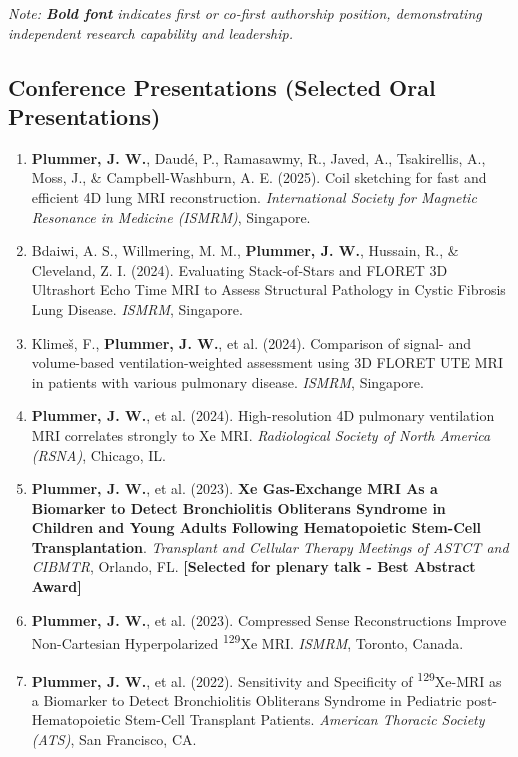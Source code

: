 \documentclass[11pt,]{scrartcl}
\begin{document}
\noindent\textit{Note: \textbf{Bold font} indicates first or co-first authorship position, demonstrating independent research capability and leadership.}

\subsection{Conference Presentations (Selected Oral Presentations)} %

\begin{enumerate}
  \leftskip-0.13in

    \item \textbf{Plummer, J. W.}, Daudé, P., Ramasawmy, R., Javed, A., Tsakirellis, A., Moss, J., \& Campbell-Washburn, A. E. (2025). Coil sketching for fast and efficient 4D lung MRI reconstruction. \textit{International Society for Magnetic Resonance in Medicine (ISMRM)}, Singapore.

    \item Bdaiwi, A. S., Willmering, M. M., \textbf{Plummer, J. W.}, Hussain, R., \& Cleveland, Z. I. (2024). Evaluating Stack-of-Stars and FLORET 3D Ultrashort Echo Time MRI to Assess Structural Pathology in Cystic Fibrosis Lung Disease. \textit{ISMRM}, Singapore.
    
    \item Klimeš, F., \textbf{Plummer, J. W.}, et al. (2024). Comparison of signal- and volume-based ventilation-weighted assessment using 3D FLORET UTE MRI in patients with various pulmonary disease. \textit{ISMRM}, Singapore.
    
    \item \textbf{Plummer, J. W.}, et al. (2024). High-resolution 4D pulmonary ventilation MRI correlates strongly to Xe MRI. \textit{Radiological Society of North America (RSNA)}, Chicago, IL.

    \item \textbf{Plummer, J. W.}, et al. (2023). \textbf{Xe Gas-Exchange MRI As a Biomarker to Detect Bronchiolitis Obliterans Syndrome in Children and Young Adults Following Hematopoietic Stem-Cell Transplantation}. \textit{Transplant and Cellular Therapy Meetings of ASTCT and CIBMTR}, Orlando, FL. \textbf{[Selected for plenary talk - Best Abstract Award]}
  
    \item \textbf{Plummer, J. W.}, et al. (2023). Compressed Sense Reconstructions Improve Non-Cartesian Hyperpolarized \textsuperscript{129}Xe MRI. \textit{ISMRM}, Toronto, Canada.
  
    \item \textbf{Plummer, J. W.}, et al. (2022). Sensitivity and Specificity of \textsuperscript{129}Xe-MRI as a Biomarker to Detect Bronchiolitis Obliterans Syndrome in Pediatric post-Hematopoietic Stem-Cell Transplant Patients. \textit{American Thoracic Society (ATS)}, San Francisco, CA.

\end{enumerate}
\end{document}
